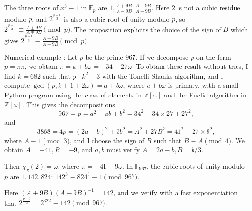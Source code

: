 \documentclass[11pt,a4paper]{article}
\newcommand{\Z}{\mathbb{Z}}
\newcommand{\F}{\mathbb{F}}
\begin{document}
\bigskip

The three roots of $x^3 - 1$ in $\F_p$ are $1, \frac{A+9B}{A-9B}, \frac{A-9B}{A+9B}$. Here $2$ is not a cubic residue modulo $p$, and $2^{\frac{p-1}{3}}$ is also a cubic root of unity modulo $p$, so $2^{\frac{p-1}{3}} \equiv  \frac{A\pm 9B}{A\mp9B} \pmod p$. The proposition  explicits the choice of the sign of $B$ which gives $2^{\frac{p-1}{3}}  \equiv \frac{A+9B}{A-9B} \pmod p$.

\bigskip

Numerical example : Let $p$ be the prime $967$. If we decompose $p$ on the form $p = \pi \overline{\pi}$, we obtain $\pi =  a + b \omega = -34 -27 \omega$. To obtain these result without tries, I find $k = 682$ such that $p \mid k^2 + 3$ with the Tonelli-Shanks algorithm, and I compute $\gcd(p, k+1 + 2\omega) = a + b \omega$, where $a + b \omega$ is primary, with a small Python program using the class of elements in $\Z[\omega]$ and the Euclid algorithm in $\Z[\omega]$. This gives the decompositions 
$$967 = p = a^2 -ab + b^2 = 34^2 - 34\times 27 + 27^2,$$
 and 
 $$3868 = 4p = (2a -b)^2 + 3b^2 = A^2 + 27 B^2 = 41^2 + 27 \times 9^2,$$
 where $A \equiv 1 \pmod 3$, and I choose the sign of $B$ such that $B \equiv A \pmod 4$. We obtain $A = -41, B = -9$, and $a,b$ must verify $A = 2a-b, B = b/3$.
 
  Then $\chi_\pi(2) = \omega$, where $\pi = -41 - 9 \omega$. In $\F_{967}$, the cubic roots of unity modulo $p$ are $1, 142, 824$: $142^3 \equiv 824^3 \equiv 1 \pmod {967}$. 
  
  Here $(A + 9B) (A - 9B)^{-1} = 142$, and we verify with a fast exponentiation that $2^\frac{p-1}{3} = 2^{322} \equiv 142 \pmod {967}.$
\end{document}
